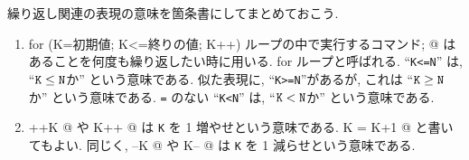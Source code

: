 \documentclass{jbook}
\begin{document}
繰り返し関連の表現の意味を箇条書にしてまとめておこう.
\begin{enumerate}
\item   {}  
\verb@ for (K=初期値; K<=終りの値; K++) {ループの中で実行するコマンド}; @
はあることを何度も繰り返したい時に用いる.
for ループと呼ばれる.
``{\tt K<=N}'' は, ``${\tt K} \leq {\tt N}$か'' という意味である.
似た表現に,
``{\tt K>=N}''があるが, これは ``${\tt K} \geq {\tt N}$か'' という意味である.
{\tt =} のない
``{\tt K<N}'' は, ``${\tt K} < {\tt N}$か'' という意味である.
\item \verb@ ++K @ や \verb@ K++ @ は {\tt K} を 1 増やせという意味である.
\verb@ K = K+1 @ と書いてもよい.
同じく, \verb@ --K @ や \verb@ K-- @ は {\tt K} を 1 減らせという意味である.
%
%
\end{enumerate}
\end{document}
